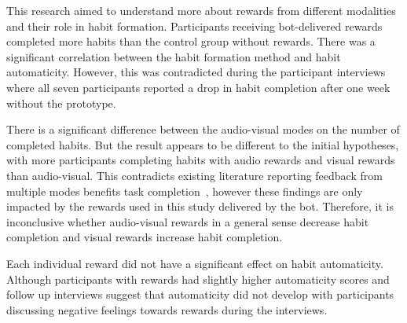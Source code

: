 \documentclass{scaffold/sigchi}
\begin{document}
This research aimed to understand more about rewards from different modalities and their role in habit formation. Participants receiving bot-delivered rewards completed more habits than the control group without rewards. There was a significant correlation between the habit formation method and habit automaticity. However, this was contradicted during the participant interviews where all seven participants reported a drop in habit completion after one week without the prototype.

There is a significant difference between the audio-visual modes on the number of completed habits. But the result appears to be different to the initial hypotheses, with more participants completing habits with audio rewards and visual rewards than audio-visual. This contradicts existing literature reporting feedback from multiple modes benefits task completion~\cite{}, however these findings are only impacted by the rewards used in this study delivered by the bot. Therefore, it is inconclusive whether audio-visual rewards in a general sense decrease habit completion and visual rewards increase habit completion.

Each individual reward did not have a significant effect on habit automaticity. Although participants with rewards had slightly higher automaticity scores and follow up interviews suggest that automaticity did not develop with participants discussing negative feelings towards rewards during the interviews.  






\end{document}
